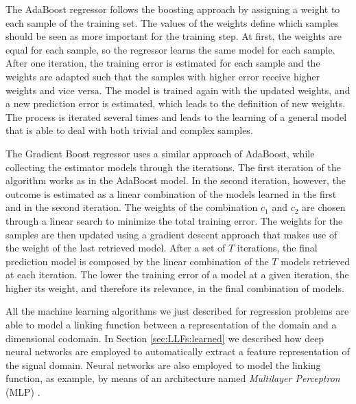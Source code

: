The AdaBoost regressor \cite{Solomatine2004} follows the boosting approach by assigning a weight to each sample of the training set. The values of the weights define which samples should be seen as more important for the training step. At first, the weights are equal for each sample, so the regressor learns the same model for each sample. After one iteration, the training error is estimated for each sample and the weights are adapted such that the samples with higher error receive higher weights and vice versa. The model is trained again with the updated weights, and a new prediction error is estimated, which leads to the definition of new weights. The process is iterated several times and leads to the learning of a general model that is able to deal with both trivial and complex samples.

The Gradient Boost regressor \cite{Zemel2001} uses a similar approach of AdaBoost, while collecting the estimator models through the iterations. The first iteration of the algorithm works as in the AdaBoost model. In the second iteration, however, the outcome is estimated as a linear combination of the models learned in the first and in the second iteration. The weights of the combination $c_1$ and $c_2$ are chosen through a linear search to minimize the total training error. The weights for the samples are then updated using a gradient descent approach that makes use of the weight of the last retrieved model. After a set of $T$ iterations, the final prediction model is composed by the linear combination of the $T$ models retrieved at each iteration. The lower the training error of a model at a given iteration, the higher its weight, and therefore its relevance, in the final combination of models.

All the machine learning algorithms we just described for regression problems are able to model a linking function between a representation of the domain and a dimensional codomain. In Section \ref{sec:LLFs:learned} we described how deep neural networks are employed to automatically extract a feature representation of the signal domain. Neural networks are also employed to model the linking function, as example, by means of an architecture named \textit{Multilayer Perceptron} (MLP) \cite{PAMI}. 

